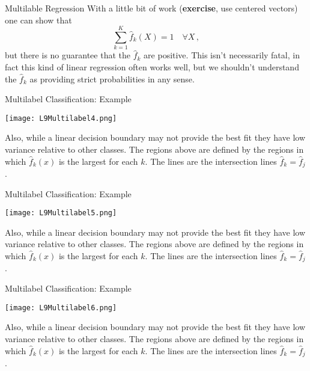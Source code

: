 \documentclass[10pt, table, dvipsnames,xcdraw, handout]{beamer}
\begin{document}
\begin{frame}[fragile]{Multilable Regression}
With a little bit of work (\textbf{exercise}, use centered vectors) one can show that 
$$
\sum_{k=1}^K \hat f_k(X) = 1\hspace{1em}\forall X\,,
$$
but there is no guarantee that the $\hat f_k$ are positive. \pause This isn't necessarily fatal, in fact this kind of linear regression often works well, but we shouldn't understand the $\hat f_k$ as providing strict probabilities in any sense. 
\end{frame}



\begin{frame}[fragile]{Multilabel Classification: Example}
  \begin{minipage}[t][0.5\textheight][t]{\textwidth}
	\centering \texttt{[image: L9Multilabel4.png]} 
  \end{minipage}
  \vfill
\begin{minipage}[t][0.5\textheight][t]{\textwidth}
Also, while a linear decision boundary may not provide the best fit they have low variance relative to other classes. \pause The regions above are defined by the regions in which $\hat f_k(x)$ is the largest for each $k$. The lines are the intersection lines $\hat f_k=\hat f_j$. 
\end{minipage}
\end{frame}



\begin{frame}[fragile]{Multilabel Classification: Example}
  \begin{minipage}[t][0.5\textheight][t]{\textwidth}
	\centering \texttt{[image: L9Multilabel5.png]} 
  \end{minipage}
  \vfill
\begin{minipage}[t][0.5\textheight][t]{\textwidth}
Also, while a linear decision boundary may not provide the best fit they have low variance relative to other classes. The regions above are defined by the regions in which $\hat f_k(x)$ is the largest for each $k$. The lines are the intersection lines $\hat f_k=\hat f_j$. 
\end{minipage}
\end{frame}



\begin{frame}[fragile]{Multilabel Classification: Example}
  \begin{minipage}[t][0.5\textheight][t]{\textwidth}
	\centering \texttt{[image: L9Multilabel6.png]} 
  \end{minipage}
  \vfill
\begin{minipage}[t][0.5\textheight][t]{\textwidth}
Also, while a linear decision boundary may not provide the best fit they have low variance relative to other classes. The regions above are defined by the regions in which $\hat f_k(x)$ is the largest for each $k$. The lines are the intersection lines $\hat f_k=\hat f_j$. 
\end{minipage}
\end{frame}
\end{document}
